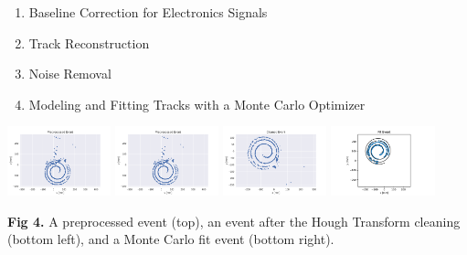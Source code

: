 \documentclass[ansiepaper,portrait]{baposter}
\begin{document}
\begin{poster}
{{\begin{enumerate}\itemsep-0.04em
\item Baseline Correction for Electronics Signals
\item Track Reconstruction
\item Noise Removal
\item Modeling and Fitting Tracks with a Monte Carlo Optimizer
\end{enumerate}

\begin{center}
\includegraphics [width=30mm] {preprocess_evt.pdf}
\hspace{0cm}
\includegraphics [width=30mm] {preprocess_evt.pdf}
\hspace{3cm}
\includegraphics [width=30mm] {clean_evt.pdf}
\hspace{0cm}
\includegraphics [width=30mm] {fit_evt.pdf}
\end{center}
\textbf{Fig 4.} A preprocessed event (top), an event after the Hough Transform cleaning (bottom left), and a Monte Carlo fit event (bottom right).}
} 


\end{poster}
\end{document}

